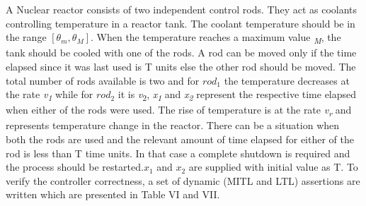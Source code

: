 {A Nuclear reactor  \citep{Alur1994} consists of two independent control rods. They act as coolants controlling temperature in a reactor tank. The coolant temperature should be in the range $[\theta_{m},\theta_{M}]$. 
When the temperature reaches a maximum value \textit{\texttheta \textsubscript{M}}, the tank should be cooled with one of the rods. A rod can be moved only if the time elapsed since it was last used is T units else the other rod should be moved. The total number of rods available is two and for $rod_{1}$ the temperature decreases at the rate \textit{v\textsubscript{1}} while for $rod_{2}$ it is \textit{v}\textsubscript{2}, \textit{x\textsubscript{1}} and \textit{x\textsubscript{2}} represent the respective  time elapsed when either of the rods were used. The rise of temperature is at the rate \textit{v\textsubscript{r}} and \textit{\texttheta}  represents temperature change in the reactor. There can be a situation when both the rods are used and the relevant amount of time elapsed for either of the rod is less than T time units. In that case a complete shutdown is required and the process should be restarted.\(x_{1}\) and \(x_{2}\) are supplied with initial value as T. 
To verify the controller correctness, a set of dynamic (MITL and LTL) assertions are written which are presented in Table VI and VII.
\begin{table}[]
	\centering
	\caption{MITL Properties for benchmark controllers }
	\label{my-label}
\end{table}}
